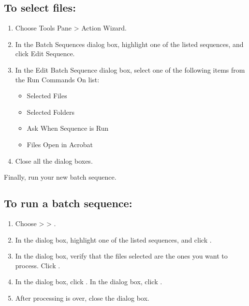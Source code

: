 \documentclass[letterpaper,12pt,english,openany,oneside]{sphinxmanual}
\begin{document}
\subsection{To select files:}
\label{\detokenize{index:to-select-files}}\begin{enumerate}
%
\item {} 
Choose Tools Pane > Action Wizard.

\item {} 
In the Batch Sequences dialog box, highlight one of the listed sequences, and click Edit Sequence.

\item {} 
In the Edit Batch Sequence dialog box, select one of the following items from the Run Commands On list:
\begin{itemize}
\item {} 
Selected Files

\item {} 
Selected Folders

\item {} 
Ask When Sequence is Run

\item {} 
Files Open in Acrobat

\end{itemize}

\item {} 
Close all the dialog boxes.

\end{enumerate}

Finally, run your new batch sequence.


\subsection{To run a batch sequence:}
\label{\detokenize{index:to-run-a-batch-sequence}}\begin{enumerate}
%
\item {} 
Choose  >  >  .

\item {} 
In the  dialog box, highlight one of the listed sequences, and click  .

\item {} 
In the  dialog box, verify that the files selected are the ones you want to process. Click  .

\item {} 
In the  dialog box, click  . In the  dialog box, click  .

\item {} 
After processing is over, close the  dialog box.

\end{enumerate}
\end{document}
